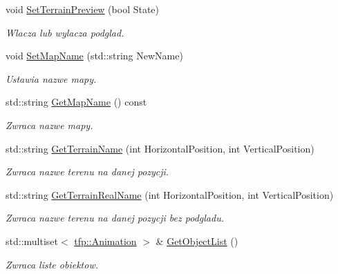 \begin{DoxyCompactItemize}
\mbox{\label{classtfp_1_1_map_a9fde19f7d79a41f95d5528571e44c770}} 
void \mbox{\hyperlink{classtfp_1_1_map_a9fde19f7d79a41f95d5528571e44c770}{Set\+Terrain\+Preview}} (bool State)
\begin{DoxyCompactList}\small\item\em Wlacza lub wylacza podglad. \end{DoxyCompactList}\item 
\mbox{\label{classtfp_1_1_map_a6e825aecc6ad7000341879a30063a132}} 
void \mbox{\hyperlink{classtfp_1_1_map_a6e825aecc6ad7000341879a30063a132}{Set\+Map\+Name}} (std\+::string New\+Name)
\begin{DoxyCompactList}\small\item\em Ustawia nazwe mapy. \end{DoxyCompactList}\item 
\mbox{\label{classtfp_1_1_map_a9b33c0256cfa31d908e14f0f04f9bfcc}} 
std\+::string \mbox{\hyperlink{classtfp_1_1_map_a9b33c0256cfa31d908e14f0f04f9bfcc}{Get\+Map\+Name}} () const
\begin{DoxyCompactList}\small\item\em Zwraca nazwe mapy. \end{DoxyCompactList}\item 
\mbox{\label{classtfp_1_1_map_ab6c370f5e0789fce1ca94ddad4dd05ae}} 
std\+::string \mbox{\hyperlink{classtfp_1_1_map_ab6c370f5e0789fce1ca94ddad4dd05ae}{Get\+Terrain\+Name}} (int Horizontal\+Position, int Vertical\+Position)
\begin{DoxyCompactList}\small\item\em Zwraca nazwe terenu na danej pozycji. \end{DoxyCompactList}\item 
std\+::string \mbox{\hyperlink{classtfp_1_1_map_ad1caa25f32dbd7712be33c3cdb7017c9}{Get\+Terrain\+Real\+Name}} (int Horizontal\+Position, int Vertical\+Position)
\begin{DoxyCompactList}\small\item\em Zwraca nazwe terenu na danej pozycji bez podgladu. \end{DoxyCompactList}\item 
\mbox{\label{classtfp_1_1_map_ad438b84f767f9e8e065de3e32e3c9419}} 
std\+::multiset$<$ \mbox{\hyperlink{classtfp_1_1_animation}{tfp\+::\+Animation}} $>$ \& \mbox{\hyperlink{classtfp_1_1_map_ad438b84f767f9e8e065de3e32e3c9419}{Get\+Object\+List}} ()
\begin{DoxyCompactList}\small\item\em Zwraca liste obiektow. \end{DoxyCompactList}\end{DoxyCompactItemize}
